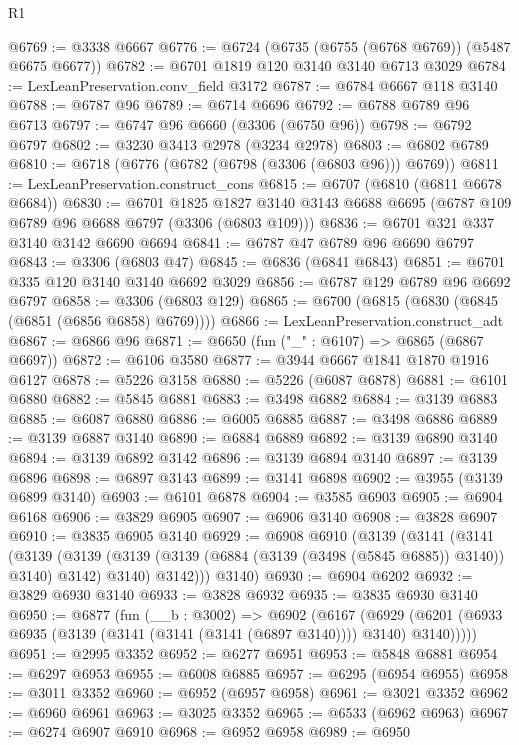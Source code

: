 \begin{lexlean}{R1}
\begin{coremodule}
@6769 := @3338 @6667
@6776 := @6724 (@6735 (@6755 (@6768 @6769)) (@5487 @6675 @6677))
@6782 := @6701 @1819 @120 @3140 @3140 @6713 @3029
@6784 := LexLeanPreservation.conv_field @3172
@6787 := @6784 @6667 @118 @3140
@6788 := @6787 @96
@6789 := @6714 @6696
@6792 := @6788 @6789 @96 @6713
@6797 := @6747 @96 @6660 (@3306 (@6750 @96))
@6798 := @6792 @6797
@6802 := @3230 @3413 @2978 (@3234 @2978)
@6803 := @6802 @6789
@6810 := @6718 (@6776 (@6782 (@6798 (@3306 (@6803 @96))) @6769))
@6811 := LexLeanPreservation.construct_cons
@6815 := @6707 (@6810 (@6811 @6678 @6684))
@6830 := @6701
    @1825
    @1827
    @3140
    @3143
    @6688
    @6695
    (@6787 @109 @6789 @96 @6688 @6797 (@3306 (@6803 @109)))
@6836 := @6701 @321 @337 @3140 @3142 @6690 @6694
@6841 := @6787 @47 @6789 @96 @6690 @6797
@6843 := @3306 (@6803 @47)
@6845 := @6836 (@6841 @6843)
@6851 := @6701 @335 @120 @3140 @3140 @6692 @3029
@6856 := @6787 @129 @6789 @96 @6692 @6797
@6858 := @3306 (@6803 @129)
@6865 := @6700 (@6815 (@6830 (@6845 (@6851 (@6856 @6858) @6769))))
@6866 := LexLeanPreservation.construct_adt
@6867 := @6866 @96
@6871 := @6650 (fun ("_" : @6107) => @6865 (@6867 @6697))
@6872 := @6106 @3580
@6877 := @3944 @6667 @1841 @1870 @1916 @6127
@6878 := @5226 @3158
@6880 := @5226 (@6087 @6878)
@6881 := @6101 @6880
@6882 := @5845 @6881
@6883 := @3498 @6882
@6884 := @3139 @6883
@6885 := @6087 @6880
@6886 := @6005 @6885
@6887 := @3498 @6886
@6889 := @3139 @6887 @3140
@6890 := @6884 @6889
@6892 := @3139 @6890 @3140
@6894 := @3139 @6892 @3142
@6896 := @3139 @6894 @3140
@6897 := @3139 @6896
@6898 := @6897 @3143
@6899 := @3141 @6898
@6902 := @3955 (@3139 @6899 @3140)
@6903 := @6101 @6878
@6904 := @3585 @6903
@6905 := @6904 @6168
@6906 := @3829 @6905
@6907 := @6906 @3140
@6908 := @3828 @6907
@6910 := @3835 @6905 @3140
@6929 := @6908
    @6910
    (@3139
      (@3141
        (@3141
          (@3139
            (@3139 (@3139 (@3139 (@6884 (@3139 (@3498 (@5845 @6885)) @3140)) @3140) @3142) @3140)
            @3142)))
      @3140)
@6930 := @6904 @6202
@6932 := @3829 @6930 @3140
@6933 := @3828 @6932
@6935 := @3835 @6930 @3140
@6950 := @6877
    (fun (__b : @3002) =>
    @6902
      (@6167
        (@6929 (@6201 (@6933 @6935 (@3139 (@3141 (@3141 (@3141 (@6897 @3140)))) @3140) @3140)))))
@6951 := @2995 @3352
@6952 := @6277 @6951
@6953 := @5848 @6881
@6954 := @6297 @6953
@6955 := @6008 @6885
@6957 := @6295 (@6954 @6955)
@6958 := @3011 @3352
@6960 := @6952 (@6957 @6958)
@6961 := @3021 @3352
@6962 := @6960 @6961
@6963 := @3025 @3352
@6965 := @6533 (@6962 @6963)
@6967 := @6274 @6907 @6910
@6968 := @6952 @6958
@6989 := @6950

\end{coremodule}
\end{lexlean}

